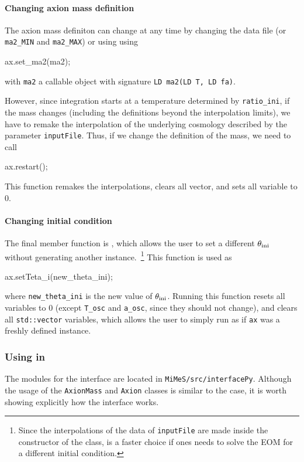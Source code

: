 \documentclass[11pt,a4paper]{article}
\begin{document}
\paragraph{Changing axion mass definition}
%
The axion mass definiton can change at any time by changing the data file (or {\tt ma2\_MIN} and {\tt ma2\_MAX}) or using using 
%
\begin{cpp}
	ax.set_ma2(ma2);
\end{cpp}
%
with {\tt ma2} a callable object with signature {\tt LD ma2(LD T, LD fa)}.

However, since integration starts at a temperature determined by {\tt ratio\_ini}, if the mass changes (including the definitions beyond the interpolation limits), we have to remake the interpolation of the underlying cosmology described by the parameter {\tt inputFile}. Thus, if we  change the definition of the mass, we need to call 
%
\begin{cpp}
	ax.restart();
\end{cpp}
%
This function remakes the interpolations, clears all vector, and sets all variable to $0$. 


\paragraph{Changing initial condition}
%
The final member function is , which allows the user to set a different $\theta_{\rm ini}{}$ without generating another instance.~\footnote{Since the interpolations of the data of {\tt inputFile} are made inside the constructor of the  class,  is a faster choice if ones needs to solve the EOM for a different initial condition.} This function is used as    
%
\begin{cpp}
	ax.setTeta_i(new_theta_ini);
\end{cpp}
%
where {\tt new\_theta\_ini} is the new value of $\theta_{\rm ini}{}$. Running this function resets all variables to $0$ (except {\tt T\_osc} and {\tt a\_osc}, since they should not change), and clears all {\tt std::vector} variables, which allows the user to simply run  as if {\tt ax} was a freshly defined instance.  



\subsubsection{Using \mimes in \PY}\label{sec:begin_py}
%
The modules for the \PY interface are located in {\tt MiMeS/src/interfacePy}. Although the usage of the {\tt AxionMass} and {\tt Axion} classes is similar to the \CPP case, it is worth showing explicitly how the \PY interface works.
\end{document}
